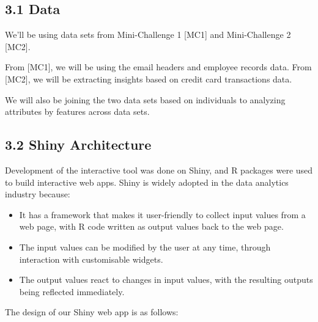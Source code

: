 \documentclass[
]{article}
\providecommand{\tightlist}{%
  \setlength{\itemsep}{0pt}\setlength{\parskip}{0pt}}
\begin{document}
\hypertarget{data}{%
\subsection{3.1 Data}\label{data}}

We'll be using data sets from Mini-Challenge 1 {[}MC1{]} and Mini-Challenge 2 {[}MC2{]}.

From {[}MC1{]}, we will be using the email headers and employee records data. From {[}MC2{]}, we will be extracting insights based on credit card transactions data.

We will also be joining the two data sets based on individuals to analyzing attributes by features across data sets.

\hypertarget{shiny-architecture}{%
\subsection{3.2 Shiny Architecture}\label{shiny-architecture}}

Development of the interactive tool was done on Shiny, and R packages were used to build interactive web apps. Shiny is widely adopted in the data analytics industry because:

\begin{itemize}
\tightlist
\item
  It has a framework that makes it user-friendly to collect input values from a web page, with R code written as output values back to the web page.
\item
  The input values can be modified by the user at any time, through interaction with customisable widgets.
\item
  The output values react to changes in input values, with the resulting outputs being reflected immediately.
\end{itemize}

The design of our Shiny web app is as follows:
\end{document}
